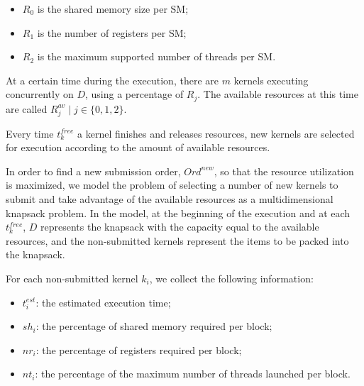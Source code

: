 \documentclass[conference]{IEEEtran}
\begin{document}

\begin{itemize}
    \item $R_{0}$ is the shared memory size per SM;
    \item $R_{1}$ is the number of registers per SM;
    \item $R_{2}$ is the maximum supported number of threads per SM.
\end{itemize}


At a certain time during the execution, there are $m$ kernels executing concurrently on $D$, using a percentage of $R_j$. The available resources at this time are called $R_{j}^{av} \mid j \in \{0, 1, 2\}$. 

Every time $t_k^{free}$ a kernel finishes and releases resources, new kernels are selected for execution according to the amount of available resources.

In order to find a new submission order, $Ord^{new}$, so that the resource utilization is maximized, we model the problem of selecting a number of new kernels to submit and take advantage of the available resources as a multidimensional knapsack problem. In the model, at the beginning of the execution and at each $t_k^{free}$, $D$ represents the knapsack with the capacity equal to the available resources, and the non-submitted kernels represent the items to be packed into the knapsack. 

For each non-submitted kernel $k_i$, we collect the following information:
\begin{itemize}
    \item $t^{est}_{i}$: the estimated execution time;
    \item $sh_i$: the percentage of shared memory required per block;
    \item $nr_i$: the percentage of registers required per block; 
    \item $nt_i$: the percentage of the maximum number of threads launched per block. 
\end{itemize}
\end{document}
